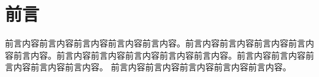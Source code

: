\chapter*{前言}

前言内容前言内容前言内容前言内容前言内容。前言内容前言内容前言内容前言内容前言内容。前言内容前言内容前言内容前言内容前言内容。前言内容前言内容前言内容前言内容前言内容。
前言内容前言内容前言内容前言内容前言内容。